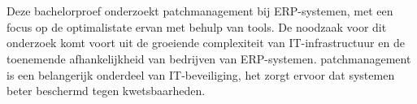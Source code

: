 
%
%
%
%
%

%



\chapter*{}


Deze bachelorproef onderzoekt patchmanagement bij ERP-systemen, met een focus op de optimalistate ervan met behulp van tools. De noodzaak voor dit onderzoek komt voort uit de groeiende complexiteit van IT-infrastructuur en de toenemende afhankelijkheid van bedrijven van ERP-systemen. patchmanagement is een belangerijk onderdeel van IT-beveiliging, het zorgt ervoor dat systemen beter beschermd tegen kwetsbaarheden.

